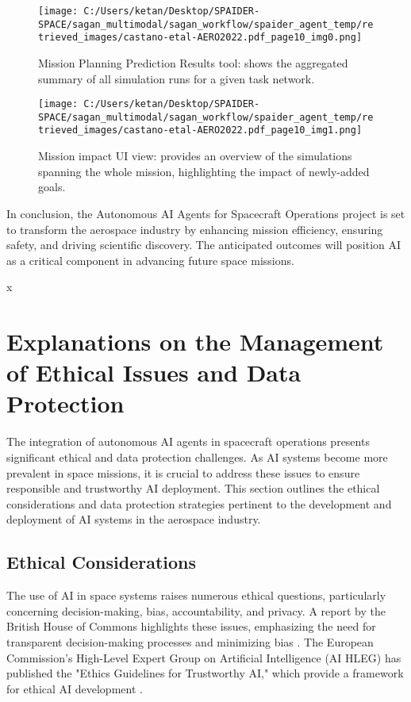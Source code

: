 \documentclass[a4paper,12pt]{article}
\begin{document}
\begin{figure}[htbp]
    \centering
    \texttt{[image: C:/Users/ketan/Desktop/SPAIDER-SPACE/sagan\_multimodal/sagan\_workflow/spaider\_agent\_temp/retrieved\_images/castano-etal-AERO2022.pdf\_page10\_img0.png]}
    \caption{Mission Planning Prediction Results tool: shows the aggregated summary of all simulation runs for a given task network.}
    \label{fig:mission-planning}
\end{figure}

\begin{figure}[htbp]
    \centering
    \texttt{[image: C:/Users/ketan/Desktop/SPAIDER-SPACE/sagan\_multimodal/sagan\_workflow/spaider\_agent\_temp/retrieved\_images/castano-etal-AERO2022.pdf\_page10\_img1.png]}
    \caption{Mission impact UI view: provides an overview of the simulations spanning the whole mission, highlighting the impact of newly-added goals.}
    \label{fig:mission-impact}
\end{figure}

In conclusion, the Autonomous AI Agents for Spacecraft Operations project is set to transform the aerospace industry by enhancing mission efficiency, ensuring safety, and driving scientific discovery. The anticipated outcomes will position AI as a critical component in advancing future space missions.



x
\section{Explanations on the Management of Ethical Issues and Data Protection}

The integration of autonomous AI agents in spacecraft operations presents significant ethical and data protection challenges. As AI systems become more prevalent in space missions, it is crucial to address these issues to ensure responsible and trustworthy AI deployment. This section outlines the ethical considerations and data protection strategies pertinent to the development and deployment of AI systems in the aerospace industry.

\subsection{Ethical Considerations}

The use of AI in space systems raises numerous ethical questions, particularly concerning decision-making, bias, accountability, and privacy. A report by the British House of Commons highlights these issues, emphasizing the need for transparent decision-making processes and minimizing bias \cite{house_of_commons_report}. The European Commission's High-Level Expert Group on Artificial Intelligence (AI HLEG) has published the "Ethics Guidelines for Trustworthy AI," which provide a framework for ethical AI development \cite{ai_hleg_guidelines}.
\end{document}

